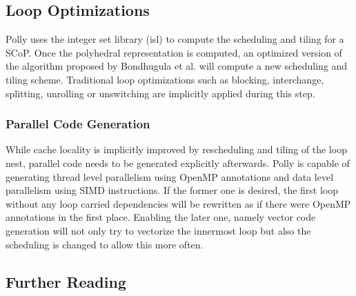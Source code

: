 \subsection{Loop Optimizations}
Polly uses the integer set library (isl) to compute the scheduling and
tiling for a SCoP. Once the polyhedral representation is computed,
an optimized version of the  algorithm proposed by Bondhugula et 
al.\cite{Bondhugula:2008:PAP:1379022.1375595}
will compute a new scheduling and tiling scheme. 
Traditional loop optimizations such as blocking, interchange, splitting,
unrolling or unswitching are implicitly applied during this step. 



\subsubsection{Parallel Code Generation}
While cache locality is implicitly improved by rescheduling and tiling 
of the loop nest,  parallel code needs to be generated explicitly afterwards.
Polly is capable of generating
thread level parallelism using OpenMP annotations and data level parallelism 
using SIMD instructions. 
If the former one is desired, the first loop without any loop carried 
dependencies will be rewritten as if there were OpenMP annotations in the first
place. Enabling the later one, namely vector code generation 
will not only try to vectorize the innermost loop but also the 
scheduling is changed to allow this more often.



\subsection*{Further Reading}


